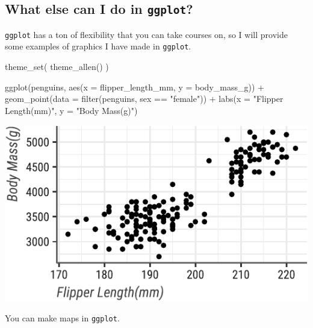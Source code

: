 \documentclass[]{tufte-handout}
\newenvironment{Shaded}{}{}
\newcommand{\AttributeTok}[1]{\textcolor[rgb]{0.49,0.56,0.16}{#1}}
\newcommand{\FunctionTok}[1]{\textcolor[rgb]{0.02,0.16,0.49}{#1}}
\newcommand{\NormalTok}[1]{#1}
\newcommand{\SpecialCharTok}[1]{\textcolor[rgb]{0.25,0.44,0.63}{#1}}
\newcommand{\StringTok}[1]{\textcolor[rgb]{0.25,0.44,0.63}{#1}}
\begin{document}
\hypertarget{what-else-can-i-do-in-ggplot}{%
\subsection{\texorpdfstring{What else can I do in
\texttt{ggplot}?}{What else can I do in ggplot?}}\label{what-else-can-i-do-in-ggplot}}

\texttt{ggplot} has a ton of flexibility that you can take courses on,
so I will provide some examples of graphics I have made in
\texttt{ggplot}.

\begin{Shaded}
\begin{Highlighting}[]
\FunctionTok{theme\_set}\NormalTok{(}
  \FunctionTok{theme\_allen}\NormalTok{()}
\NormalTok{)}


\FunctionTok{ggplot}\NormalTok{(penguins, }\FunctionTok{aes}\NormalTok{(}\AttributeTok{x =}\NormalTok{ flipper\_length\_mm, }\AttributeTok{y =}\NormalTok{ body\_mass\_g)) }\SpecialCharTok{+}
  \FunctionTok{geom\_point}\NormalTok{(}\AttributeTok{data =} \FunctionTok{filter}\NormalTok{(penguins, sex }\SpecialCharTok{==} \StringTok{"female"}\NormalTok{)) }\SpecialCharTok{+}
  \FunctionTok{labs}\NormalTok{(}\AttributeTok{x =} \StringTok{"Flipper Length(mm)"}\NormalTok{, }\AttributeTok{y =} \StringTok{"Body Mass(g)"}\NormalTok{)}
\end{Highlighting}
\end{Shaded}

\begin{center}\includegraphics{R-Guide_files/figure-latex/penguins-example-with-fonts-1} \end{center}

You can make maps in \texttt{ggplot}.
\end{document}
